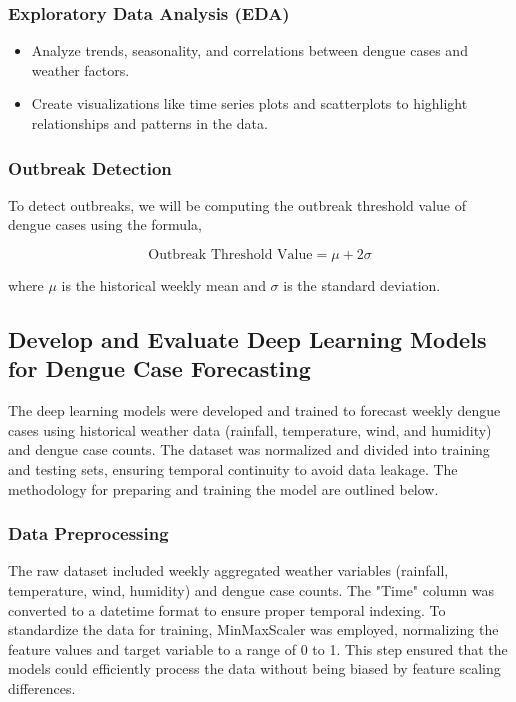 \subsubsection{Exploratory Data Analysis (EDA)}
\begin{itemize}
	\item Analyze trends, seasonality, and correlations between dengue cases and weather factors.
	\item Create visualizations like time series plots and scatterplots to highlight relationships and patterns in the data.
\end{itemize}

\subsubsection{Outbreak Detection}
To detect outbreaks, we will be computing the outbreak threshold value of dengue cases using the formula, 

\begin{equation}
	\text{Outbreak Threshold Value} = \mu + 2\sigma
\end{equation}

where \(\mu\) is the historical weekly mean and \(\sigma \) is the standard deviation.

\subsection{Develop and Evaluate Deep Learning Models for Dengue Case Forecasting}
The deep learning models were developed and trained to forecast weekly dengue cases using historical weather data (rainfall, temperature, wind, and humidity) and dengue case counts. The dataset was normalized and divided into training and testing sets, ensuring temporal continuity to avoid data leakage. The methodology for preparing and training the model are outlined below.
\subsubsection{Data Preprocessing}
The raw dataset included weekly aggregated weather variables (rainfall, temperature, wind, humidity) and dengue case counts. The "Time" column was converted to a datetime format to ensure proper temporal indexing. To standardize the data for training, MinMaxScaler was employed, normalizing the feature values and target variable to a range of 0 to 1. This step ensured that the models could efficiently process the data without being biased by feature scaling differences.


